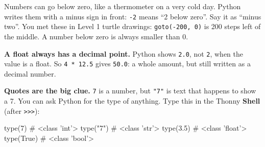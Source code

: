 \begin{center}
\end{center}

\begin{tip}
Numbers can go below zero, like a thermometer on a very cold day. Python writes them with a minus sign in front:
\texttt{-2} means \enquote{2 below zero}. Say it as \enquote{minus two}. You met these in Level 1 turtle drawings:
\texttt{goto(-200, 0)} is 200 steps left of the middle. A number below zero is always smaller than 0.
\end{tip}

\textbf{A float always has a decimal point.} Python shows \texttt{2.0}, not \texttt{2}, when the value is a float.
So \texttt{4 * 12.5} gives \texttt{50.0}: a whole amount, but still written as a decimal number.

\textbf{Quotes are the big clue.} \texttt{7} is a number, but \texttt{"7"} is text that happens to show a 7.
You can ask Python for the type of anything. Type this in the Thonny \textbf{Shell} (after \texttt{>>>}):
\begin{pycode}
type(7)        # <class 'int'>
type("7")      # <class 'str'>
type(3.5)      # <class 'float'>
type(True)     # <class 'bool'>
\end{pycode}


